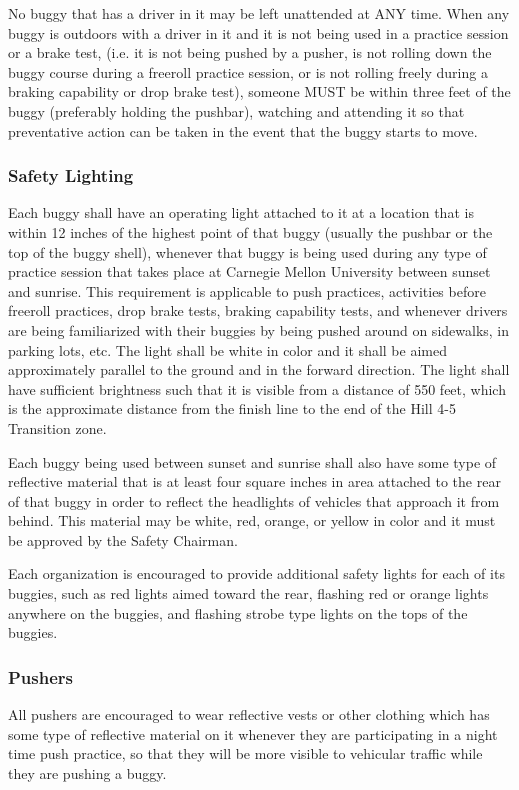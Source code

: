 \documentclass[openany]{book}
\begin{document}
No buggy that has a driver in it may be left unattended at ANY time. When any buggy is outdoors with a driver in it and it is not being used in a practice session or a brake test, (i.e. it is not being pushed by a pusher, is not rolling down the buggy course during a freeroll practice session, or is not rolling freely during a braking capability or drop brake test), someone MUST be within three feet of the buggy (preferably holding the pushbar), watching and attending it so that preventative action can be taken in the event that the buggy starts to move.

\subsubsection{Safety Lighting}

Each buggy shall have an operating light attached to it at a location that is within 12 inches of the highest point of that buggy (usually the pushbar or the top of the buggy shell), whenever that buggy is being used during any type of practice session that takes place at Carnegie Mellon University between sunset and sunrise. This requirement is applicable to push practices, activities before freeroll practices, drop brake tests, braking capability tests, and whenever drivers are being familiarized with their buggies by being pushed around on sidewalks, in parking lots, etc. The light shall be white in color and it shall be aimed approximately parallel to the ground and in the forward direction. The light shall have sufficient brightness such that it is visible from a distance of 550 feet, which is the approximate distance from the finish line to the end of the Hill 4-5 Transition zone.

Each buggy being used between sunset and sunrise shall also have some type of reflective material that is at least four square inches in area attached to the rear of that buggy in order to reflect the headlights of vehicles that approach it from behind. This material may be white, red, orange, or yellow in color and it must be approved by the Safety Chairman.

Each organization is encouraged to provide additional safety lights for each of its buggies, such as red lights aimed toward the rear, flashing red or orange lights anywhere on the buggies, and flashing strobe type lights on the tops of the buggies.

\subsubsection{Pushers}
All pushers are encouraged to wear reflective vests or other clothing which has some type of reflective material on it whenever they are participating in a night time push practice, so that they will be more visible to vehicular traffic while they are pushing a buggy.
\end{document}
